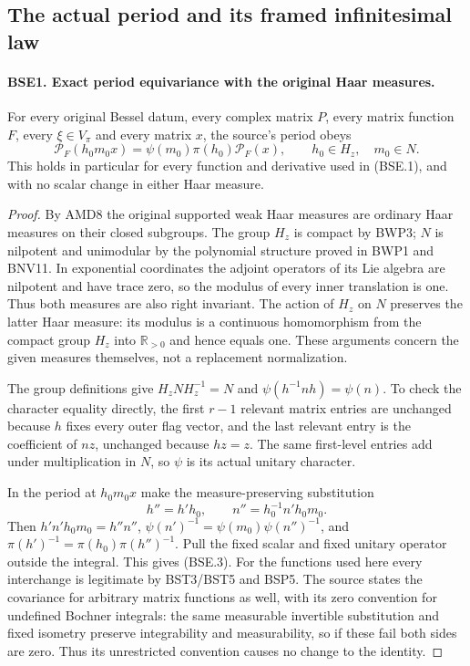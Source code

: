\subsection{The actual period and its framed infinitesimal law}

\paragraph{BSE1. Exact period equivariance with the original Haar measures.}
\label{claim:BSE1}
For every original Bessel datum, every complex matrix $P$,
every matrix function $F$, every $\xi\in V_\pi$ and every matrix
$x$, the source's period obeys
\[
 \mathcal P_F(h_0m_0x)
       =\psi(m_0)\pi(h_0)\mathcal P_F(x),
       \qquad h_0\in H_z,\quad m_0\in N.
 \tag{BSE.3}
\]
This holds in particular for every function and derivative used in
(BSE.1), and with no scalar change in either Haar measure.

\begin{proof}
By AMD8 the original supported weak Haar measures are ordinary Haar
measures on their closed subgroups.  The group $H_z$ is compact by
BWP3; $N$ is nilpotent and unimodular by the polynomial structure
proved in BWP1 and BNV11.  In exponential coordinates the adjoint
operators of its Lie algebra are nilpotent and have trace zero,
so the modulus of every inner translation is one.  Thus both
measures are also right invariant.
The action of $H_z$ on $N$ preserves the latter Haar measure:
its modulus is a continuous homomorphism from the compact group
$H_z$ into $\mathbb R_{>0}$ and hence equals one.
These arguments concern the given measures themselves, not a
replacement normalization.

The group definitions give $H_zNH_z^{-1}=N$ and
$\psi(h^{-1}nh)=\psi(n)$.  To check the character equality directly,
the first $r-1$ relevant matrix entries are unchanged because
$h$ fixes every outer flag vector, and the last relevant entry
is the coefficient of $nz$, unchanged because $hz=z$.
The same first-level entries add under multiplication in $N$,
so $\psi$ is its actual unitary character.

In the period at $h_0m_0x$ make the measure-preserving substitution
\[
             h''=h'h_0,\qquad
             n''=h_0^{-1}n'h_0m_0.
 \tag{BSE.4}
\]
Then $h'n'h_0m_0=h''n''$,
$\psi(n')^{-1}=\psi(m_0)\psi(n'')^{-1}$, and
$\pi(h')^{-1}=\pi(h_0)\pi(h'')^{-1}$.
Pull the fixed scalar and fixed unitary operator outside the
integral.  This gives (BSE.3).
For the functions used here every interchange is legitimate by
BST3/BST5 and BSP5.  The source states the covariance for arbitrary
matrix functions as well, with its zero convention for undefined
Bochner integrals: the same measurable invertible substitution and
fixed isometry preserve integrability and measurability, so if these
fail both sides are zero.  Thus its unrestricted convention causes
no change to the identity.
\end{proof}


